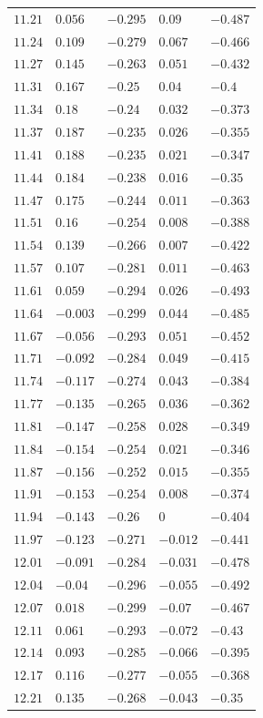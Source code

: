 \begin{table}[h]
\begin{tabular}{rllll}
$11.21$&$0.056$&$-0.295$&$0.09$&$-0.487$\\
$11.24$&$0.109$&$-0.279$&$0.067$&$-0.466$\\
$11.27$&$0.145$&$-0.263$&$0.051$&$-0.432$\\
$11.31$&$0.167$&$-0.25$&$0.04$&$-0.4$\\
$11.34$&$0.18$&$-0.24$&$0.032$&$-0.373$\\
$11.37$&$0.187$&$-0.235$&$0.026$&$-0.355$\\
$11.41$&$0.188$&$-0.235$&$0.021$&$-0.347$\\
$11.44$&$0.184$&$-0.238$&$0.016$&$-0.35$\\
$11.47$&$0.175$&$-0.244$&$0.011$&$-0.363$\\
$11.51$&$0.16$&$-0.254$&$0.008$&$-0.388$\\
$11.54$&$0.139$&$-0.266$&$0.007$&$-0.422$\\
$11.57$&$0.107$&$-0.281$&$0.011$&$-0.463$\\
$11.61$&$0.059$&$-0.294$&$0.026$&$-0.493$\\
$11.64$&$-0.003$&$-0.299$&$0.044$&$-0.485$\\
$11.67$&$-0.056$&$-0.293$&$0.051$&$-0.452$\\
$11.71$&$-0.092$&$-0.284$&$0.049$&$-0.415$\\
$11.74$&$-0.117$&$-0.274$&$0.043$&$-0.384$\\
$11.77$&$-0.135$&$-0.265$&$0.036$&$-0.362$\\
$11.81$&$-0.147$&$-0.258$&$0.028$&$-0.349$\\
$11.84$&$-0.154$&$-0.254$&$0.021$&$-0.346$\\
$11.87$&$-0.156$&$-0.252$&$0.015$&$-0.355$\\
$11.91$&$-0.153$&$-0.254$&$0.008$&$-0.374$\\
$11.94$&$-0.143$&$-0.26$&$0$&$-0.404$\\
$11.97$&$-0.123$&$-0.271$&$-0.012$&$-0.441$\\
$12.01$&$-0.091$&$-0.284$&$-0.031$&$-0.478$\\
$12.04$&$-0.04$&$-0.296$&$-0.055$&$-0.492$\\
$12.07$&$0.018$&$-0.299$&$-0.07$&$-0.467$\\
$12.11$&$0.061$&$-0.293$&$-0.072$&$-0.43$\\
$12.14$&$0.093$&$-0.285$&$-0.066$&$-0.395$\\
$12.17$&$0.116$&$-0.277$&$-0.055$&$-0.368$\\
$12.21$&$0.135$&$-0.268$&$-0.043$&$-0.35$\\

\end{tabular}
\end{table}
